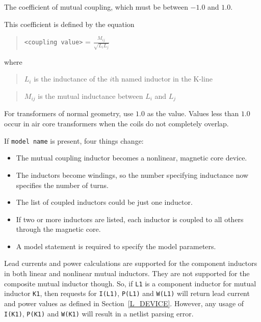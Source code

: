 \begin{Device}
\begin{Parameters}

The coefficient of mutual coupling, which must be between $-1.0$ and
$1.0$.

This coefficient is defined by the equation
\begin{quote}
  \texttt{<coupling value>} = $\frac{M_{ij}}{\sqrt{L_iL_j}}$
\end {quote}

where
\begin{quote}
  $L_i$ is the inductance of the $i$th named inductor in the K-line
\end {quote}
\begin{quote}
    $M_{ij}$ is the mutual inductance between $L_i$ and $L_j$
\end {quote}
For transformers of normal geometry, use $1.0$ as the value. Values less
than $1.0$ occur in air core transformers when the coils do not
completely overlap.


If \texttt{model name} is present, four things change:
\begin{itemize}
  \item The mutual coupling inductor becomes a nonlinear, magnetic core device.
  \item The inductors become windings, so the number specifying inductance now
        specifies the number of turns.
  \item The list of coupled inductors could be just one inductor.
  \item If two or more inductors are listed, each inductor is coupled to all others through the magnetic core.
  \item A model statement is required to specify the model parameters.
\end{itemize}

\end{Parameters}

\comments
Lead currents and power calculations are supported for the component inductors in both
linear and nonlinear mutual inductors.  They are not supported for the composite
mutual inductor though.  So, if \texttt{L1} is a component inductor for mutual inductor
\texttt{K1}, then requests for \texttt{I(L1)}, \texttt{P(L1)} and \texttt{W(L1)} will 
return lead current and power values as defined in Section~\ref{L_DEVICE}.  However, 
any usage of \texttt{I(K1)}, \texttt{P(K1)} and \texttt{W(K1)} will result in a 
\Xyce{} netlist parsing error.

\end{Device}

